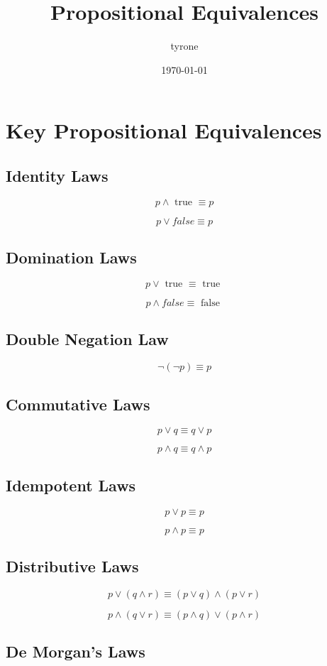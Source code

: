 \documentclass[11pt]{article}
\author{tyrone}
\date{\today}
\title{Propositional Equivalences}
\begin{document}
\maketitle
\section{Key Propositional Equivalences}
\label{sec:org24c8cf6}


\subsection{Identity Laws}
\label{sec:org9be9fad}

\[
p  \land \text{ true } \equiv p
\]

\[
p \lor false \equiv p 
\]
\subsection{Domination Laws}
\label{sec:org045f6e9}

\[
p \lor \text{ true } \equiv \text{ true }
\]

\[
p \land false \equiv \text{ false }
\]
\subsection{Double Negation Law}
\label{sec:org1ba0647}

\[
\neg(\neg p) \equiv p
\]
\subsection{Commutative Laws}
\label{sec:org25b139d}

\[
p \lor q \equiv q \lor p
\]

\[
p \land q \equiv q \land p
\]
\subsection{Idempotent Laws}
\label{sec:org42dd65a}

\[
p \lor p \equiv p
\]

\[
p \land p \equiv p
\]
\subsection{Distributive Laws}
\label{sec:orge2fc5c1}

\[
p \lor (q \land r) \equiv (p \lor q) \land (p \lor r)
\]

\[
p \land (q \lor r) \equiv (p \land q) \lor (p \land r)
\]
\subsection{De Morgan's Laws}
\label{sec:org63ae5f7}
\end{document}

